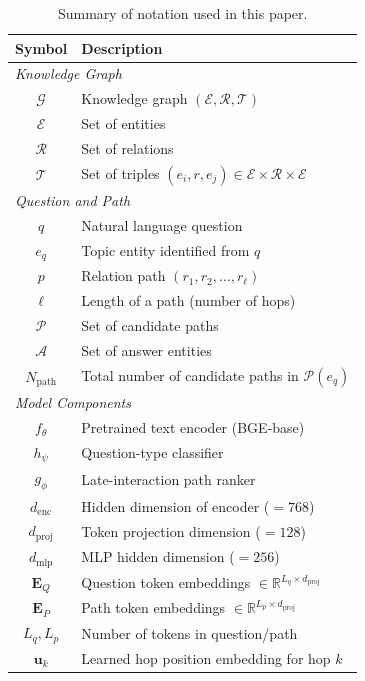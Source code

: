 \documentclass[conference]{IEEEtran}
\begin{document}
\begin{table}[t]
\centering
\caption{Summary of notation used in this paper.}
\label{tab:notation}
\begin{tabular}{cl}
\toprule
\textbf{Symbol} & \textbf{Description} \\
\midrule
\multicolumn{2}{l}{\textit{Knowledge Graph}} \\
$\mathcal{G}$ & Knowledge graph $(\mathcal{E}, \mathcal{R}, \mathcal{T})$ \\
$\mathcal{E}$ & Set of entities \\
$\mathcal{R}$ & Set of relations \\
$\mathcal{T}$ & Set of triples $(e_i, r, e_j) \in \mathcal{E} \times \mathcal{R} \times \mathcal{E}$ \\
\midrule
\multicolumn{2}{l}{\textit{Question and Path}} \\
$q$ & Natural language question \\
$e_q$ & Topic entity identified from $q$ \\
$p$ & Relation path $(r_1, r_2, \ldots, r_\ell)$ \\
$\ell$ & Length of a path (number of hops) \\
$\mathcal{P}$ & Set of candidate paths \\
$\mathcal{A}$ & Set of answer entities \\
$N_{\text{path}}$ & Total number of candidate paths in $\mathcal{P}(e_q)$ \\
\midrule
\multicolumn{2}{l}{\textit{Model Components}} \\
$f_\theta$ & Pretrained text encoder (BGE-base) \\
$h_\psi$ & Question-type classifier \\
$g_\phi$ & Late-interaction path ranker \\
$d_{\text{enc}}$ & Hidden dimension of encoder ($= 768$) \\
$d_{\text{proj}}$ & Token projection dimension ($= 128$) \\
$d_{\text{mlp}}$ & MLP hidden dimension ($= 256$) \\
$\mathbf{E}_Q$ & Question token embeddings $\in \mathbb{R}^{L_q \times d_{\text{proj}}}$ \\
$\mathbf{E}_P$ & Path token embeddings $\in \mathbb{R}^{L_p \times d_{\text{proj}}}$ \\
$L_q, L_p$ & Number of tokens in question/path \\
$\mathbf{u}_k$ & Learned hop position embedding for hop $k$ \\

\end{tabular}
\end{table}
\end{document}
